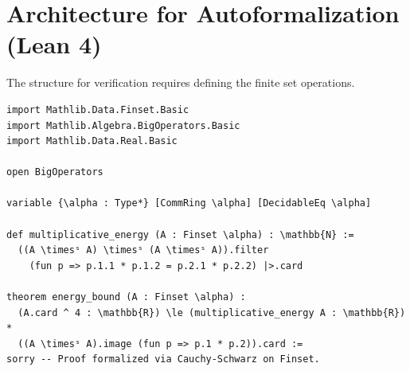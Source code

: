\documentclass[11pt,a4paper]{article}
\begin{document}
\section{Architecture for Autoformalization (Lean 4)}
The structure for verification requires defining the finite set operations.
\begin{verbatim}
import Mathlib.Data.Finset.Basic
import Mathlib.Algebra.BigOperators.Basic
import Mathlib.Data.Real.Basic

open BigOperators

variable {\alpha : Type*} [CommRing \alpha] [DecidableEq \alpha]

def multiplicative_energy (A : Finset \alpha) : \mathbb{N} :=
  ((A \timesˢ A) \timesˢ (A \timesˢ A)).filter
    (fun p => p.1.1 * p.1.2 = p.2.1 * p.2.2) |>.card

theorem energy_bound (A : Finset \alpha) :
  (A.card ^ 4 : \mathbb{R}) \le (multiplicative_energy A : \mathbb{R}) *
  ((A \timesˢ A).image (fun p => p.1 * p.2)).card :=
sorry -- Proof formalized via Cauchy-Schwarz on Finset.
\end{verbatim}
\end{document}
